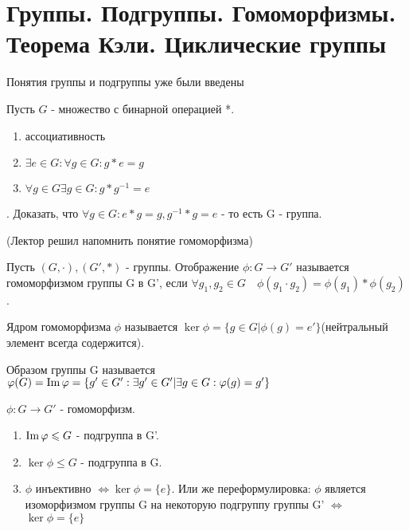 \section{Группы. Подгруппы. Гомоморфизмы. Теорема Кэли. Циклические группы}
Понятия группы и подгруппы уже были введены
\begin{exercise}
	Пусть \(G\) - множество с бинарной операцией *. 
	\begin{enumerate}
		\item ассоциативность 
		\item \(\exists e\in G: \forall g\in G: g*e = g \)
		\item \(\forall g\in G \exists g\in G: g*g^{-1} = e\)
	\end{enumerate}. Доказать, что \(\forall g\in G: e*g = g, g^{-1}*g = e\) - то есть G - группа.
\end{exercise}
(Лектор решил напомнить понятие гомоморфизма)
\begin{definition}
	Пусть \((G, \cdot), (G', *)\) - группы. Отображение \(\phi:G\to G'\) называется гомоморфизмом группы G в G', если \(\forall g_1, g_2\in G \quad \phi(g_1\cdot g_2) = \phi(g_1)*\phi(g_2)\).
\end{definition}
\begin{definition}
	Ядром гомоморфизма $\phi$ называется \(\ker \phi = \{g\in G|\phi(g) = e'\}\)(нейтральный элемент всегда содержится).
\end{definition}
\begin{definition}
	Образом группы G называется \(\varphi(G) = \operatorname{Im} \varphi = \{g'\in G': \exists g'\in G'|\exists g\in G: \varphi(g)=g'\}\)
\end{definition}
\begin{proposition}
	$\phi:G\to G'$ - гомоморфизм.
	\begin{enumerate}
		\item\(\operatorname{Im} \varphi \leqslant G\) - подгруппа в G'.
		\item\(\ker \phi \le G\) - подгруппа в G. 
		\item $\phi$ инъективно $\Longleftrightarrow \ker \phi = \{e\}$. Или же переформулировка: $\phi$ является изоморфизмом группы G на некоторую подгруппу группы G' $\Longleftrightarrow$ \(\ker \phi = \{e\}\)
	\end{enumerate}
\end{proposition}
